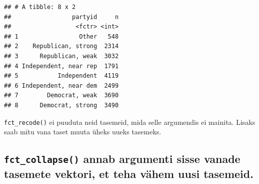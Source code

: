\documentclass[]{book}
\newenvironment{Shaded}{\begin{snugshade}}{\end{snugshade}}
\newcommand{\KeywordTok}[1]{\textcolor[rgb]{0.13,0.29,0.53}{\textbf{#1}}}
\newcommand{\DataTypeTok}[1]{\textcolor[rgb]{0.13,0.29,0.53}{#1}}
\newcommand{\StringTok}[1]{\textcolor[rgb]{0.31,0.60,0.02}{#1}}
\newcommand{\OperatorTok}[1]{\textcolor[rgb]{0.81,0.36,0.00}{\textbf{#1}}}
\newcommand{\NormalTok}[1]{#1}
\begin{document}
\begin{Shaded}
\end{Shaded}

\begin{verbatim}
## # A tibble: 8 x 2
##                 partyid     n
##                  <fctr> <int>
## 1                 Other   548
## 2    Republican, strong  2314
## 3      Republican, weak  3032
## 4 Independent, near rep  1791
## 5           Independent  4119
## 6 Independent, near dem  2499
## 7        Democrat, weak  3690
## 8      Democrat, strong  3490
\end{verbatim}

\texttt{fct\_recode()} ei puuduta neid tasemeid, mida selle argumendis
ei mainita. Lisaks saab mitu vana taset muuta üheks uueks tasemeks.

\subsection{\texorpdfstring{\texttt{fct\_collapse()} annab argumenti
sisse vanade tasemete vektori, et teha vähem uusi
tasemeid.}{fct\_collapse() annab argumenti sisse vanade tasemete vektori, et teha vähem uusi tasemeid.}}\label{fct_collapse-annab-argumenti-sisse-vanade-tasemete-vektori-et-teha-vahem-uusi-tasemeid.}
\end{document}
